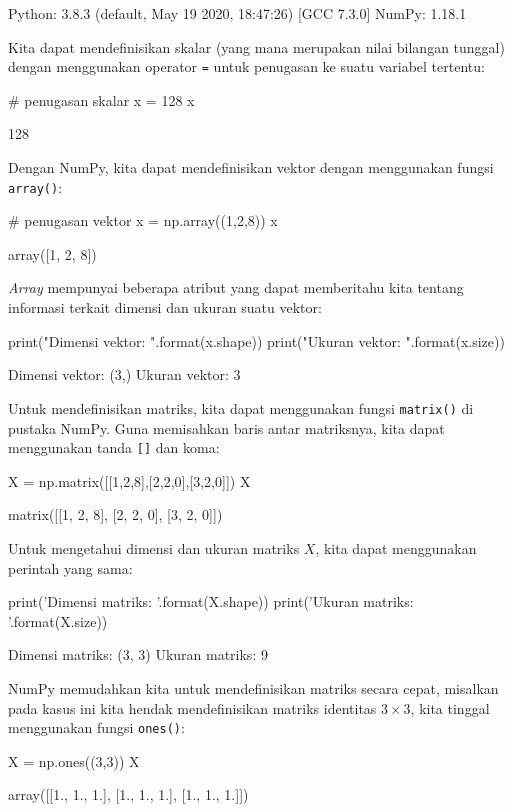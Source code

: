 \begin{pyin}
Python: 3.8.3 (default, May 19 2020, 18:47:26) 
[GCC 7.3.0]
NumPy: 1.18.1
\end{pyin}

Kita dapat mendefinisikan skalar (yang mana merupakan nilai bilangan tunggal) dengan menggunakan operator \verb|=| untuk penugasan ke suatu variabel tertentu:

\begin{pyin}
# penugasan skalar
x = 128
x
\end{pyin}

\begin{pyout}
128
\end{pyout}

Dengan NumPy, kita dapat mendefinisikan vektor dengan menggunakan fungsi \verb|array()|:
\begin{pyin}
# penugasan vektor
x = np.array((1,2,8))
x
\end{pyin}
\begin{pyout}
array([1, 2, 8])
\end{pyout}

\textit{Array} mempunyai beberapa atribut yang dapat memberitahu kita tentang informasi terkait dimensi dan ukuran suatu vektor:

\begin{pyin}
print("Dimensi vektor: {}".format(x.shape))
print("Ukuran vektor: {}".format(x.size))
\end{pyin}
\begin{pyout}
Dimensi vektor: (3,)
Ukuran vektor: 3
\end{pyout}

Untuk mendefinisikan matriks, kita dapat menggunakan fungsi \verb|matrix()| di pustaka NumPy. Guna memisahkan baris antar matriksnya, kita dapat menggunakan tanda \verb|[]| dan koma:

\begin{pyin}
X = np.matrix([[1,2,8],[2,2,0],[3,2,0]])
X
\end{pyin}
\begin{pyout}
matrix([[1, 2, 8],
        [2, 2, 0],
        [3, 2, 0]])        
\end{pyout}


Untuk mengetahui dimensi dan ukuran matriks $X$, kita dapat menggunakan perintah yang sama:

\begin{pyin}
print('Dimensi matriks: {}'.format(X.shape))
print('Ukuran matriks: {}'.format(X.size))
\end{pyin}
\begin{pyout}
Dimensi matriks: (3, 3)
Ukuran matriks: 9
\end{pyout}
NumPy memudahkan kita untuk mendefinisikan matriks secara cepat, misalkan pada kasus ini kita hendak mendefinisikan matriks identitas $3 \times 3$, kita tinggal menggunakan fungsi \verb|ones()|:
\begin{pyin}
X = np.ones((3,3))
X
\end{pyin}
\begin{pyout}
array([[1., 1., 1.],
       [1., 1., 1.],
       [1., 1., 1.]])
\end{pyout}

